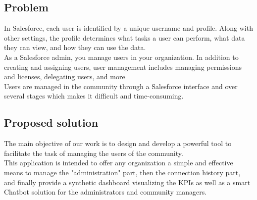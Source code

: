 \subsection{Problem}
In Salesforce, each user is identified by a unique username and profile. Along with other settings, the profile determines what tasks a user can perform, what data they can view, and how they can use the data.\\
As a Salesforce admin, you manage users in your organization. In addition to creating and assigning users, user management includes managing permissions and licenses, delegating users, and more \\

Users are managed in the community through a Salesforce interface and over several stages which makes it difficult and time-consuming.
\subsection{Proposed solution}
The main objective of our work is to design and develop a powerful tool to facilitate the task of managing the users of the community.\\
This application is intended to offer any organization a simple and effective means to manage the "administration" part, then the connection history part, and finally provide a synthetic dashboard visualizing the KPIs as well as a smart Chatbot solution for the administrators and community managers.
